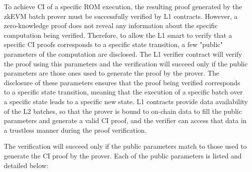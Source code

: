 To achieve CI of a specific ROM execution, the resulting proof generated by the zkEVM batch prover must be successfully verified by L1 contracts. However, a zero-knowledge proof does not reveal any information about the specific computation being verified. Therefore, to allow the L1 smart to verify that a specific CI proofs corresponds to a specific state transition, a few "public" parameters of the computation are disclosed. The L1 verifier contract will verify the proof using this parameters and the verification will succeed only if the public parameters are those ones used to generate the proof by the prover. The disclosure of these parameters ensures that the proof being verified corresponds to a specific state transition, meaning that the execution of a specific batch over a specific state leads to a specific new state. L1 contracts provide data availability of the L2 batches, so that the prover is bound to on-chain data to fill the public parameters and generate a valid CI proof, and the verifier can access that data in a trustless manner during the proof verification.

The verification will succeed only if the public parameters match to those used to generate the CI proof by the prover. Each of the public parameters is listed and detailed below:


